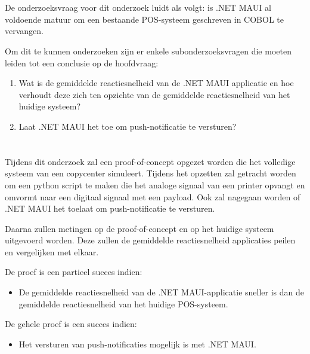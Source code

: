 \section{}%
\label{sec:onderzoeksvraag}

De onderzoeksvraag voor dit onderzoek luidt als volgt: is .NET MAUI al voldoende matuur om een bestaande POS-systeem geschreven in COBOL te vervangen.

Om dit te kunnen onderzoeken zijn er enkele subonderzoeksvragen die moeten leiden tot een conclusie op de hoofdvraag:

\begin{enumerate}  
    \item Wat is de gemiddelde reactiesnelheid van de .NET MAUI applicatie en hoe verhoudt deze zich ten opzichte van de gemiddelde reactiesnelheid van het huidige systeem?
    
    \item Laat .NET MAUI het toe om push-notificatie te versturen?
\end{enumerate}

\section{}%
\label{sec:onderzoeksdoelstelling}

Tijdens dit onderzoek zal een proof-of-concept opgezet worden die het volledige systeem van een copycenter simuleert. Tijdens het opzetten zal getracht worden om een python script te maken die het analoge signaal van een printer opvangt en omvormt naar een digitaal signaal met een payload. Ook zal nagegaan worden of .NET MAUI het toelaat om push-notificatie te versturen.

Daarna zullen metingen op de proof-of-concept en op het huidige systeem uitgevoerd worden. Deze zullen de gemiddelde reactiesnelheid applicaties peilen en vergelijken met elkaar.

De proef is een partieel succes indien:
\begin{itemize}
    \item De gemiddelde reactiesnelheid van de .NET MAUI-applicatie sneller is dan de gemiddelde reactiesnelheid van het huidige POS-systeem.
\end{itemize}

De gehele proef is een succes indien:

\begin{itemize}
    \item Het versturen van push-notificaties mogelijk is met .NET MAUI.
\end{itemize}

